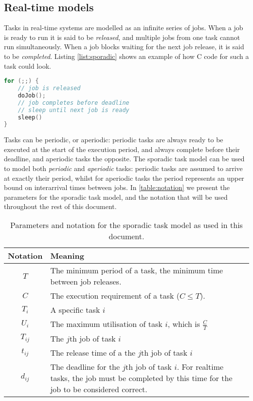 \subsection{Real-time models}

Tasks in real-time systems are modelled as an infinite series of jobs.
When a job is ready to run it is said to be \emph{released}, and multiple jobs from one task cannot run simultaneously.
When a job blocks waiting for the next job release, it is said to be \emph{completed}.
Listing \ref{list:sporadic} shows an example of how C code for such a task could look.

\begin{lstlisting}[frame=single,language=c,caption=Example of a basic sporadic real-time task.,label=list:sporadic,float=htpb]
for (;;) {
	// job is released
	doJob();
	// job completes before deadline
    // sleep until next job is ready
    sleep()
}
\end{lstlisting}


\noindent
Tasks can be periodic, or aperiodic: periodic tasks are always ready to be executed at the start of the execution period, and always complete before their deadline, and aperiodic tasks the opposite.
The sporadic task model can be used to model both \emph{periodic} and \emph{aperiodic} tasks: periodic tasks are assumed to arrive at exactly their period, whilst for aperiodic tasks the period represents an upper bound on interarrival times between jobs.
In \autoref{table:notation} we present the parameters for the sporadic task model, and the notation that will be used throughout the rest of this document.

\begin{table}
\begin{center}
    \begin{tabular}{|c|p{}|}\hline
    \textbf{Notation} & \textbf{Meaning} \\\hline
    $T$               & The minimum period of a task, the minimum time between job releases. \\\hline
    $C$               & The execution requirement of a task ($C \leq T$). \\\hline
    $T_{i}$           & A specific task $i$ \\\hline
    $U_{i}$           & The maximum utilisation of task $i$, which is $\frac{C}{T}$ \\\hline
    $T_{ij}$          & The $j$th job of task $i$ \\\hline
    $t_{ij}$          & The release time of a the $j$th job of task $i$ \\\hline
    $d_{ij}$          & The deadline for the $j$th job of task $i$. For realtime tasks, the job must be completed by this time for the job to be considered correct. \\\hline
    \end {tabular}
    \caption{Parameters and notation for the sporadic task model as used in this document.}
    \label{tab:notation}
\end{center}
\end{table}

